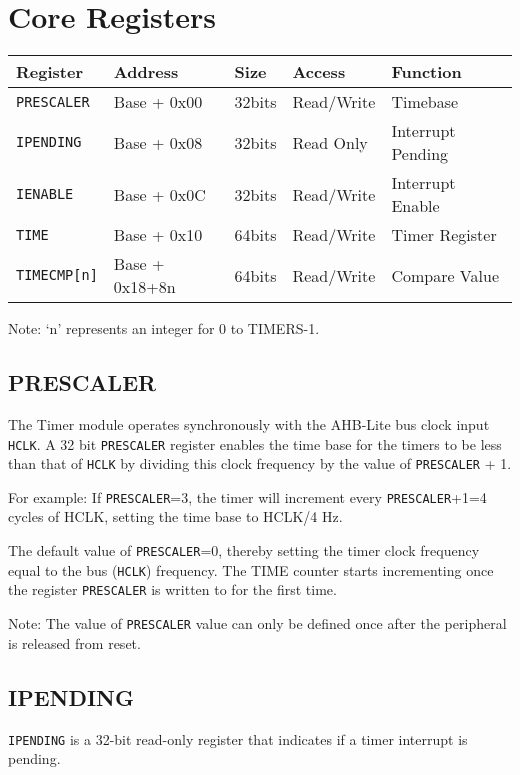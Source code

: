 \section{Core Registers}\label{core-registers}

\begin{longtable}[]{@{}lllll@{}}
\toprule
Register & Address & Size & Access & Function\tabularnewline
\midrule
\endhead
\texttt{PRESCALER}  & Base + 0x00    & 32bits & Read/Write & Timebase\tabularnewline
\texttt{IPENDING}   & Base + 0x08    & 32bits & Read Only  & Interrupt Pending\tabularnewline
\texttt{IENABLE}    & Base + 0x0C    & 32bits & Read/Write & Interrupt Enable\tabularnewline
\texttt{TIME}       & Base + 0x10    & 64bits & Read/Write & Timer Register\tabularnewline
\texttt{TIMECMP[n]} & Base + 0x18+8n & 64bits & Read/Write & Compare Value\tabularnewline
\bottomrule
\end{longtable}

Note: `n' represents an integer for 0 to TIMERS-1.

\subsection{PRESCALER}\label{prescaler}

The Timer module operates synchronously with the AHB-Lite bus clock
input \texttt{HCLK}. A 32 bit \texttt{PRESCALER} register enables the time base for the
timers to be less than that of \texttt{HCLK} by dividing this clock frequency by
the value of \texttt{PRESCALER} + 1.

For example: If \texttt{PRESCALER}=3, the timer will increment every \texttt{PRESCALER}+1=4
cycles of HCLK, setting the time base to HCLK/4 Hz.

The default value of \texttt{PRESCALER}=0, thereby setting the timer clock
frequency equal to the bus (\texttt{HCLK}) frequency. The TIME counter starts
incrementing once the register \texttt{PRESCALER} is written to for the first
time.

Note: The value of \texttt{PRESCALER} value can only be defined once after the
peripheral is released from reset.

\subsection{IPENDING}\label{ipending}

\texttt{IPENDING} is a 32-bit read-only register that indicates if a timer
interrupt is pending.

